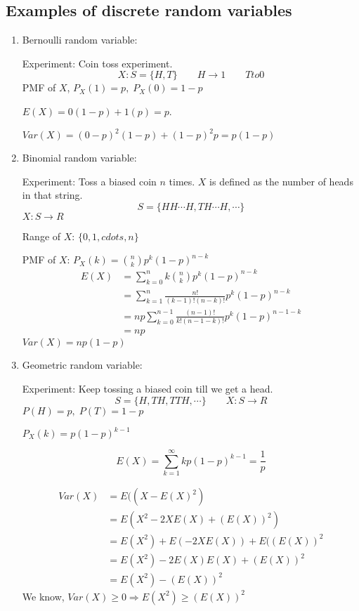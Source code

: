 \documentclass{article}
\begin{document}
\subsection{Examples of discrete random variables}
\begin{enumerate}
    \item Bernoulli random variable:

    Experiment: Coin toss experiment.
    $$X:S = \{ H,T\} \qquad H \to 1 \qquad T to 0$$
    PMF of $X$, $P_X(1)= p,\; P_X(0)=1-p$

    $E(X)= 0(1-p)+1(p)=p$.

    $Var(X)= (0-p)^2(1-p)+ (1-p)^2 p = p(1-p)$


    \item Binomial random variable:

    Experiment: Toss a biased coin $n$ times. $X$ is defined as the number of heads in that string.
    $$ S= \{ HH\cdots H, TH\cdots H, \cdots \}$$
    $X:S \to R$

    Range of $X$: $\{ 0,1, cdots, n\}$

    PMF of $X$: $P_X (k)= {n \choose k} p^k (1-p)^{n-k}$
    \begin{align*}
        E(X)&= \sum_{k=0}^{n}k {n \choose k} p^k (1-p)^{n-k}\\
        &= \sum_{k=1}^{n} \frac{n!}{(k-1)!(n-k)!} p^k (1-p)^{n-k} \\
        &= np \sum_{k=0}^{n-1} \frac{(n-1)!}{k!(n-1-k)!} p^k (1-p)^{n-1-k} \\
        &= np
    \end{align*}
    $Var(X)= np(1-p)$

    \item Geometric random variable:

    Experiment: Keep tossing a biased coin till we get a head.
    $$ S= \{ H, TH, TTH, \cdots \} \qquad X:S \to R$$
    $P(H)= p, \; P(T)= 1-p$

    $P_X(k)= p(1-p)^{k-1}$

    $$E(X)= \sum_{k=1}^{\infty} k p (1-p)^{k-1}= \frac{1}{p}$$

    \begin{align*}
        Var(X)&= E((X-E(X)^2)\\
        &= E(X^2 -2X E(X) + (E(X))^2)\\
        &= E(X^2)+E(-2XE(X))+E((E(X))^2\\
        &= E(X^2)-2E(X)E(X)+(E(X))^2 \\
        &= E(X^2)-(E(X))^2
    \end{align*}
    We know, $Var(X) \geq 0 \Rightarrow E(X^2) \geq (E(X))^2$


\end{enumerate}
\end{document}
